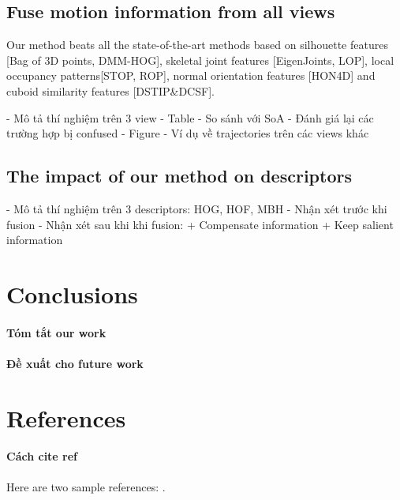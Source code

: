 \documentclass[review]{elsarticle}
\begin{document}
\subsection{Fuse motion information from all views}
 Our method beats all the state-of-the-art methods based on silhouette features [Bag of 3D points, DMM-HOG], skeletal joint features [EigenJoints, LOP], local occupancy patterns[STOP, ROP], normal orientation features [HON4D] and cuboid similarity features [DSTIP\&DCSF].
 
- Mô tả thí nghiệm trên 3 view
- Table - So sánh với SoA
- Đánh giá lại các trường hợp bị confused
- Figure - Ví dụ về trajectories trên các views khác

\subsection{The impact of our method on descriptors}
- Mô tả thí nghiệm trên 3 descriptors: HOG, HOF, MBH
- Nhận xét trước khi fusion
- Nhận xét sau khi khi fusion:
    + Compensate information
    + Keep salient information

\section{Conclusions}

\paragraph{Tóm tắt our work}

\paragraph{Đề xuất cho future work}



\section*{References}

\paragraph{Cách cite ref}Here are two sample references: \cite{Feynman1963118,Dirac1953888}.


\end{document}
